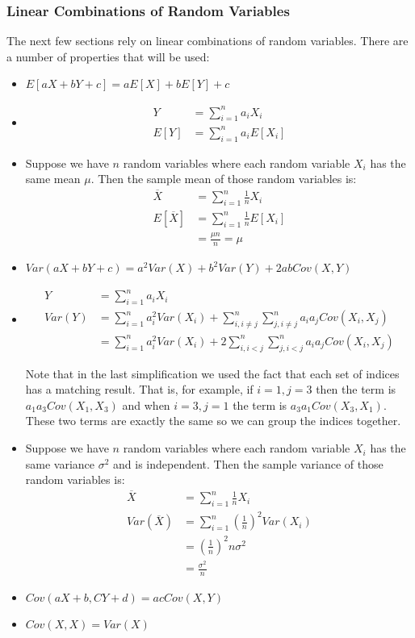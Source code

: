 \documentclass[12pt, letterpaper]{article}
\begin{document}
\subsubsection{Linear Combinations of Random Variables}
The next few sections rely on linear combinations of random variables. There are a number of properties that will be used:
\begin{itemize}
\item $E[aX + bY + c] = aE[X] + bE[Y] + c$
\item \begin{align*}
Y &= \sum_{i = 1}^{n} a_i X_i\\
E[Y] &= \sum_{i = 1}^{n} a_i E[X_i]
\end{align*}
\item Suppose we have $n$ random variables where each random variable $X_i$ has the same mean $\mu$. Then the sample mean of those random variables is: \begin{align*}
\overline{X} &= \sum_{i = 1}^{n} \frac{1}{n} X_i\\
E[\overline{X}]& = \sum_{i = 1}^{n} \frac{1}{n} E[X_i]\\
&= \frac{\mu n}{n} = \mu
\end{align*}
\item $Var\left(aX + bY + c\right) = a^2 Var\left(X\right) + b^2 Var\left(Y\right) + 2ab Cov\left(X, Y\right)$\\
\item \begin{align*}
Y &= \sum_{i = 1}^{n} a_i X_i\\
Var\left(Y\right) &= \sum_{i = 1}^{n} a_i^2 Var\left(X_i\right) + \sum_{i, i \neq j}^{n} \sum_{j, i \neq j}^{n} a_i a_j Cov\left(X_i, X_j\right)\\
&= \sum_{i = 1}^{n} a_i^2 Var\left(X_i\right) + 2 \sum_{i, i < j}^{n} \sum_{j, i < j}^{n} a_i a_j Cov\left(X_i, X_j\right)
\end{align*}

Note that in the last simplification we used the fact that each set of indices has a matching result. That is, for example, if $i = 1, j = 3$ then the term is $a_1 a_3 Cov\left(X_1, X_3\right)$ and when $i = 3, j = 1$ the term is $a_3 a_1 Cov\left(X_3, X_1\right)$. These two terms are exactly the same so we can group the indices together.
\item Suppose we have $n$ random variables where each random variable $X_i$ has the same variance $\sigma^2$ and is independent.  Then the sample variance of those random variables is: \begin{align*}
\overline{X} &= \sum_{i = 1}^{n} \frac{1}{n} X_i\\
Var\left(\overline{X}\right) &= \sum_{i = 1}^{n} \left(\frac{1}{n}\right)^2 Var\left(X_i\right)\\
&= \left(\frac{1}{n}\right)^2 n \sigma^2\\
&= \frac{\sigma^2}{n}
\end{align*}
\item $Cov\left(aX + b, CY + d\right) = acCov\left(X, Y\right)$
\item $Cov\left(X, X\right) = Var\left(X\right)$
\end{itemize}
\end{document}
